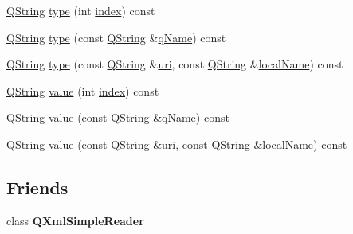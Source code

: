 \begin{DoxyCompactItemize}
\item 
\mbox{\hyperlink{class_q_string}{Q\+String}} \mbox{\hyperlink{class_q_xml_attributes_a922b2f1cbb3d4d39843ca23019eb4b72}{type}} (int \mbox{\hyperlink{class_q_xml_attributes_a5d219582743f952156f1bf66fe843ea4}{index}}) const
\item 
\mbox{\hyperlink{class_q_string}{Q\+String}} \mbox{\hyperlink{class_q_xml_attributes_a4429db38a5c429d93919187981e01bc0}{type}} (const \mbox{\hyperlink{class_q_string}{Q\+String}} \&\mbox{\hyperlink{class_q_xml_attributes_a1dadc4d5470c544f9826f438d9aa3321}{q\+Name}}) const
\item 
\mbox{\hyperlink{class_q_string}{Q\+String}} \mbox{\hyperlink{class_q_xml_attributes_abb1c0e26e7f55c8d3296778705e09821}{type}} (const \mbox{\hyperlink{class_q_string}{Q\+String}} \&\mbox{\hyperlink{class_q_xml_attributes_aff9c3f007752e367a6ccc83fb3537496}{uri}}, const \mbox{\hyperlink{class_q_string}{Q\+String}} \&\mbox{\hyperlink{class_q_xml_attributes_aac2045c7130627fffb30ae132d3e44ac}{local\+Name}}) const
\item 
\mbox{\hyperlink{class_q_string}{Q\+String}} \mbox{\hyperlink{class_q_xml_attributes_aa5bb29e5e301fef6e80c99a19f902c32}{value}} (int \mbox{\hyperlink{class_q_xml_attributes_a5d219582743f952156f1bf66fe843ea4}{index}}) const
\item 
\mbox{\hyperlink{class_q_string}{Q\+String}} \mbox{\hyperlink{class_q_xml_attributes_aeec12bba8c7db83033d1c62d9263d9b8}{value}} (const \mbox{\hyperlink{class_q_string}{Q\+String}} \&\mbox{\hyperlink{class_q_xml_attributes_a1dadc4d5470c544f9826f438d9aa3321}{q\+Name}}) const
\item 
\mbox{\hyperlink{class_q_string}{Q\+String}} \mbox{\hyperlink{class_q_xml_attributes_a89f8c3bd24121c177e1369ae5ea51f15}{value}} (const \mbox{\hyperlink{class_q_string}{Q\+String}} \&\mbox{\hyperlink{class_q_xml_attributes_aff9c3f007752e367a6ccc83fb3537496}{uri}}, const \mbox{\hyperlink{class_q_string}{Q\+String}} \&\mbox{\hyperlink{class_q_xml_attributes_aac2045c7130627fffb30ae132d3e44ac}{local\+Name}}) const
\end{DoxyCompactItemize}
\subsection*{Friends}
\begin{DoxyCompactItemize}
\item 
\mbox{\label{class_q_xml_attributes_aba6d8e1fe7917a5056b07bf8d4b4e53c}} 
class {\bfseries Q\+Xml\+Simple\+Reader}
\end{DoxyCompactItemize}


